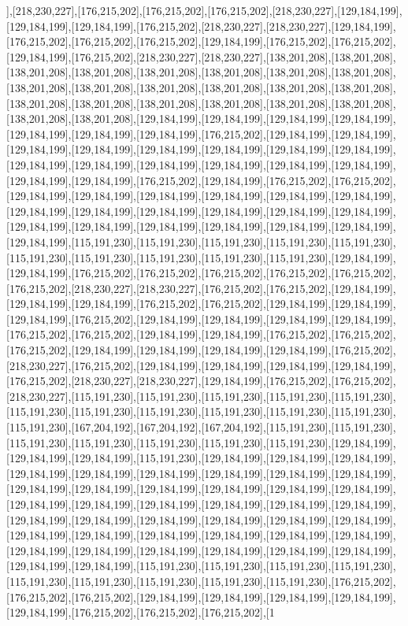 ],[218,230,227],[176,215,202],[176,215,202],[176,215,202],[218,230,227],[129,184,199],[129,184,199],[129,184,199],[176,215,202],[218,230,227],[218,230,227],[129,184,199],[176,215,202],[176,215,202],[176,215,202],[129,184,199],[176,215,202],[176,215,202],[129,184,199],[176,215,202],[218,230,227],[218,230,227],[138,201,208],[138,201,208],[138,201,208],[138,201,208],[138,201,208],[138,201,208],[138,201,208],[138,201,208],[138,201,208],[138,201,208],[138,201,208],[138,201,208],[138,201,208],[138,201,208],[138,201,208],[138,201,208],[138,201,208],[138,201,208],[138,201,208],[138,201,208],[138,201,208],[138,201,208],[129,184,199],[129,184,199],[129,184,199],[129,184,199],[129,184,199],[129,184,199],[129,184,199],[176,215,202],[129,184,199],[129,184,199],[129,184,199],[129,184,199],[129,184,199],[129,184,199],[129,184,199],[129,184,199],[129,184,199],[129,184,199],[129,184,199],[129,184,199],[129,184,199],[129,184,199],[129,184,199],[129,184,199],[176,215,202],[129,184,199],[176,215,202],[176,215,202],[129,184,199],[129,184,199],[129,184,199],[129,184,199],[129,184,199],[129,184,199],[129,184,199],[129,184,199],[129,184,199],[129,184,199],[129,184,199],[129,184,199],[129,184,199],[129,184,199],[129,184,199],[129,184,199],[129,184,199],[129,184,199],[129,184,199],[115,191,230],[115,191,230],[115,191,230],[115,191,230],[115,191,230],[115,191,230],[115,191,230],[115,191,230],[115,191,230],[115,191,230],[129,184,199],[129,184,199],[176,215,202],[176,215,202],[176,215,202],[176,215,202],[176,215,202],[176,215,202],[218,230,227],[218,230,227],[176,215,202],[176,215,202],[129,184,199],[129,184,199],[129,184,199],[176,215,202],[176,215,202],[129,184,199],[129,184,199],[129,184,199],[176,215,202],[129,184,199],[129,184,199],[129,184,199],[129,184,199],[176,215,202],[176,215,202],[129,184,199],[129,184,199],[176,215,202],[176,215,202],[176,215,202],[129,184,199],[129,184,199],[129,184,199],[129,184,199],[176,215,202],[218,230,227],[176,215,202],[129,184,199],[129,184,199],[129,184,199],[129,184,199],[176,215,202],[218,230,227],[218,230,227],[129,184,199],[176,215,202],[176,215,202],[218,230,227],[115,191,230],[115,191,230],[115,191,230],[115,191,230],[115,191,230],[115,191,230],[115,191,230],[115,191,230],[115,191,230],[115,191,230],[115,191,230],[115,191,230],[167,204,192],[167,204,192],[167,204,192],[115,191,230],[115,191,230],[115,191,230],[115,191,230],[115,191,230],[115,191,230],[115,191,230],[129,184,199],[129,184,199],[129,184,199],[115,191,230],[129,184,199],[129,184,199],[129,184,199],[129,184,199],[129,184,199],[129,184,199],[129,184,199],[129,184,199],[129,184,199],[129,184,199],[129,184,199],[129,184,199],[129,184,199],[129,184,199],[129,184,199],[129,184,199],[129,184,199],[129,184,199],[129,184,199],[129,184,199],[129,184,199],[129,184,199],[129,184,199],[129,184,199],[129,184,199],[129,184,199],[129,184,199],[129,184,199],[129,184,199],[129,184,199],[129,184,199],[129,184,199],[129,184,199],[129,184,199],[129,184,199],[129,184,199],[129,184,199],[129,184,199],[129,184,199],[129,184,199],[129,184,199],[115,191,230],[115,191,230],[115,191,230],[115,191,230],[115,191,230],[115,191,230],[115,191,230],[115,191,230],[115,191,230],[176,215,202],[176,215,202],[176,215,202],[129,184,199],[129,184,199],[129,184,199],[129,184,199],[129,184,199],[176,215,202],[176,215,202],[176,215,202],[1